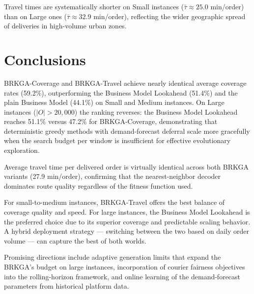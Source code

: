 \documentclass[runningheads]{llncs}
\begin{document}
Travel times are systematically shorter on Small instances ($\bar{\tau} \approx 25.0$ min/order) than on Large ones ($\bar{\tau} \approx 32.9$ min/order), reflecting the wider geographic spread of deliveries in high-volume urban zones.


\section{Conclusions}\label{sec:conclusions}

BRKGA-Coverage and BRKGA-Travel achieve nearly identical average coverage rates (59.2\%), outperforming the Business Model Lookahead (51.4\%) and the plain Business Model (44.1\%) on Small and Medium instances. On Large instances ($|O|>20{,}000$) the ranking reverses: the Business Model Lookahead reaches 51.1\% versus 47.2\% for BRKGA-Coverage, demonstrating that deterministic greedy methods
with demand-forecast deferral scale more gracefully when the search budget per window is insufficient for effective evolutionary exploration.


Average travel time per delivered order is virtually identical
across both BRKGA variants (27.9 min/order), confirming that
the nearest-neighbor decoder dominates route quality regardless
of the fitness function used.


For small-to-medium instances, BRKGA-Travel offers the best
balance of coverage quality and speed.
For large instances, the Business Model Lookahead is the
preferred choice due to its superior coverage and predictable
scaling behavior.
A hybrid deployment strategy — switching between the two
based on daily order volume — can capture the best of both worlds.

Promising directions include adaptive generation limits that
expand the BRKGA's budget on large instances, incorporation of
courier fairness objectives into the rolling-horizon framework,
and online learning of the demand-forecast parameters from
historical platform data.
\end{document}
